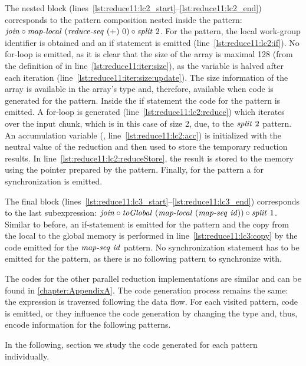 The nested block (lines~\ref{lst:reduce11:lc2_start}--\ref{lst:reduce11:lc2_end}) corresponds to the pattern composition nested inside the \iterateN pattern:
$\text{\textit{join}} \circ \text{\textit{map-local}}\ (\text{\textit{reduce-seq}}\ (+)\ 0) \circ \text{\textit{split}}\ 2$.
For the \mapLocal pattern, the local work-group identifier is obtained and an if statement is emitted (line~\ref{lst:reduce11:lc2:if}).
No for-loop is emitted, as it is clear that the size of the array is maximal 128 (from the definition of  in line~\ref{lst:reduce11:iter:size}), as the variable is halved after each iteration (line~\ref{lst:reduce11:iter:size:update}).
The size information of the array is available in the array's type and, therefore, available when code is generated for the \mapLocal pattern.
Inside the if statement the code for the \reduceSeq pattern is emitted.
A for-loop is generated (line~\ref{lst:reduce11:lc2:reduce}) which iterates over the input chunk, which is in this case of size 2, due, to the $\text{\textit{split}}\ 2$ pattern.
An accumulation variable (, line~\ref{lst:reduce11:lc2:acc}) is initialized with the neutral value of the reduction and then used to store the temporary reduction results.
In line~\ref{lst:reduce11:lc2:reduceStore}, the result is stored to the memory using the  pointer prepared by the \iterateN pattern.
Finally, for the \mapLocal pattern a  for synchronization is emitted.

The final block (lines~\ref{lst:reduce11:lc3_start}--\ref{lst:reduce11:lc3_end}) corresponds to the last subexpression:
$\text{\textit{join}} \circ \text{\textit{toGlobal}}\ (\text{\textit{map-local}}\ (\text{\textit{map-seq}}\ \text{\textit{id}})) \circ \text{\textit{split}}\ 1$.
Similar to before, an if-statement is emitted for the \mapLocal pattern and the copy from the local to the global memory is performed in line~\ref{lst:reduce11:lc3:copy} by the code emitted for the $\text{\textit{map-seq}}\ \text{\textit{id}}$ pattern.
No synchronization statement has to be emitted for the \mapLocal pattern, as there is no following pattern to synchronize with.

\bigskip

The \OpenCL codes for the other parallel reduction implementations are similar and can be found in \autoref{chapter:AppendixA}.
The code generation process remains the same:
the expression is traversed following the data flow.
For each visited pattern, \OpenCL code is emitted, or they influence the code generation by changing the type and, thus, encode information for the following patterns.

In the following, section we study the \OpenCL code generated for each pattern individually.





